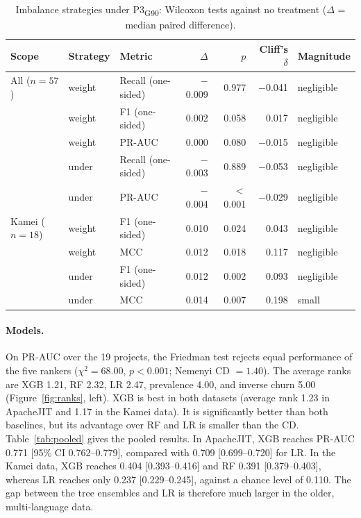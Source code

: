 \documentclass[11pt,a4paper]{article}
\newcommand{\pthree}{P3\textsubscript{G90}}
\begin{document}
\begin{table}[t]
\centering
\caption{Imbalance strategies under \pthree{}: Wilcoxon tests against no treatment ($\Delta$ = median paired difference).}
\label{tab:imb}
\small
\begin{tabular}{lllrrrl}
\toprule
Scope & Strategy & Metric & $\Delta$ & $p$ & Cliff's $\delta$ & Magnitude \\
\midrule
All ($n=57$) & weight & Recall (one-sided) & $-$0.009 & 0.977 & $-$0.041 & negligible \\
             & weight & F1 (one-sided)     & 0.002 & 0.058 & 0.017 & negligible \\
             & weight & PR-AUC             & 0.000 & 0.080 & $-$0.015 & negligible \\
             & under  & Recall (one-sided) & $-$0.003 & 0.889 & $-$0.053 & negligible \\
             & under  & PR-AUC             & $-$0.004 & $<$0.001 & $-$0.029 & negligible \\
\midrule
Kamei ($n=18$) & weight & F1 (one-sided) & 0.010 & 0.024 & 0.043 & negligible \\
               & weight & MCC            & 0.012 & 0.018 & 0.117 & negligible \\
               & under  & F1 (one-sided) & 0.012 & 0.002 & 0.093 & negligible \\
               & under  & MCC            & 0.014 & 0.007 & 0.198 & small \\
\bottomrule
\end{tabular}
\end{table}

\paragraph{Models.} On PR-AUC over the 19 projects, the Friedman test rejects equal performance of the five rankers ($\chi^2=68.00$, $p<0.001$; Nemenyi CD $=1.40$). The average ranks are XGB 1.21, RF 2.32, LR 2.47, prevalence 4.00, and inverse churn 5.00 (Figure~\ref{fig:ranks}, left). XGB is best in both datasets (average rank 1.23 in ApacheJIT and 1.17 in the Kamei data). It is significantly better than both baselines, but its advantage over RF and LR is smaller than the CD. Table~\ref{tab:pooled} gives the pooled results. In ApacheJIT, XGB reaches PR-AUC 0.771 [95\% CI 0.762--0.779], compared with 0.709 [0.699--0.720] for LR. In the Kamei data, XGB reaches 0.404 [0.393--0.416] and RF 0.391 [0.379--0.403], whereas LR reaches only 0.237 [0.229--0.245], against a chance level of 0.110. The gap between the tree ensembles and LR is therefore much larger in the older, multi-language data.
\end{document}

